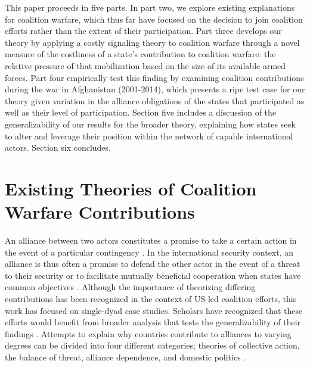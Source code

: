 \documentclass[12pt,letterpaper]{article}
\begin{document}
	This paper proceeds in five parts. In part two, we explore existing explanations for coalition warfare, which thus far have focused on the decision to join coalition efforts rather than the extent of their participation. Part three develops our theory by applying a costly signaling theory to coalition warfare through a novel measure of the costliness of a state's contribution to coalition warfare: the relative pressure of that mobilization based on the size of its available armed forces. Part four empirically test this finding by examining coalition contributions during the war in Afghanistan (2001-2014), which presents a ripe test case for our theory given variation in the alliance obligations of the states that participated as well as their level of participation. Section five includes a discussion of the generalizability of our results for the broader theory, explaining how states seek to alter and leverage their position within the network of capable international actors. Section six concludes.

\section{Existing Theories of Coalition Warfare Contributions}
	An alliance between two actors constitutes a promise to take a certain action in the event of a particular contingency \citep[526]{altfeld_decisionallytheory_1984}. In the international security context, an alliance is thus often a promise to defend the other actor in the event of a threat to their security \citep{waltz_theoryinternationalpolitics_1979, walt_originsalliance_1987} or to facilitate mutually beneficial cooperation when states have common objectives \citep{keohane_hegemonycooperationdiscord_1984, wolford_showingrestraintsignaling_2014}. Although the importance of theorizing differing contributions has been recognized in the context of US-led coalition efforts, this work has focused on single-dyad case studies. Scholars have recognized that these efforts would benefit from broader analysis that tests the generalizability of their findings \citep[4-5]{mello_politicsmultinationalmilitary_2018}. Attempts to explain why countries contribute to alliances to varying degrees can be divided into four different categories; theories of collective action, the balance of threat, alliance dependence, and domestic politics \citep{bennett_burdensharingpersiangulf_1994, haesebrouck_democraticparticipationair_2016}.
	
\end{document}
